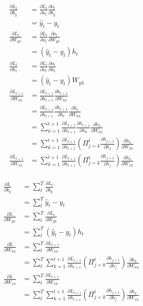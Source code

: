 \documentclass[a4paper]{article}
\begin{document}
\begin{align*}
    \frac{\partial L_t}{\partial b_y}
    &= \frac{\partial L_t}{\partial o_t}\frac{\partial o_t}{\partial b_y} \\
    &= \hat{y}_t-y_t \\
    \frac{\partial L_t}{\partial W_{yh}}
    &= \frac{\partial L_t}{\partial o_t}\frac{\partial o_t}{\partial W_{yh}} \\
    &= (\hat{y}_t-y_t)h_t \\
    \frac{\partial L_t}{\partial h_t}
    &= \frac{\partial L_t}{\partial o_t}\frac{\partial o_t}{\partial h_t} \\
    &= (\hat{y}_t-y_t)W_{yh} \\
    \frac{\partial L_{t+1}}{\partial W_{hh}}
    &= \frac{\partial L_{t+1}}{\partial h_{t+1}}\frac{\partial h_{t+1}}{\partial W_{hh}} \\
    &= \frac{\partial L_{t+1}}{\partial h_{t+1}}\frac{\partial h_{t+1}}{\partial h_t}\frac{\partial h_t}{\partial W_{hh}} \\
    &= \sum_{k=1}^{t+1}\frac{\partial L_{t+1}}{\partial h_{t+1}}\frac{\partial h_{t+1}}{\partial h_k}\frac{\partial h_k}{\partial W_{hh}} \\
    &= \sum_{k=1}^{t+1}\frac{\partial L_{t+1}}{\partial h_{t+1}}\left(\Pi_{j=k}^t\frac{\partial h_{j+1}}{\partial h_j}\right)\frac{\partial h_k}{\partial W_{hh}} \\
    \frac{\partial L_{t+1}}{\partial W_{xh}}
    &= \sum_{k=1}^{t+1}\frac{\partial L_{t+1}}{\partial h_{t+1}}\left(\Pi_{j=k}^t\frac{\partial h_{j+1}}{\partial h_j}\right)\frac{\partial h_k}{\partial W_{xh}} \\
\end{align*}

\begin{align*}
    \frac{\partial L}{\partial b_y}
    &= \sum_t^T\frac{\partial L_t}{\partial b_y} \\
    &= \sum_t^T\hat{y}_t-y_t \\
    \frac{\partial L}{\partial W_{yh}}
    &= \sum_t^T\frac{\partial L_t}{\partial W_{yh}} \\
    &= \sum_t^T(\hat{y}_t-y_t)h_t \\
    \frac{\partial L}{\partial W_{hh}}
    &= \sum_t^T\frac{\partial L_{t+1}}{\partial W_{hh}} \\
    &= \sum_t^T\sum_{k=1}^{t+1}\frac{\partial L_{t+1}}{\partial h_{t+1}}\left(\Pi_{j=k}^t\frac{\partial h_{j+1}}{\partial h_j}\right)\frac{\partial h_k}{\partial W_{hh}} \\
    \frac{\partial L}{\partial W_{xh}}
    &= \sum_t^T\frac{\partial L_{t+1}}{\partial W_{xh}} \\
    &= \sum_t^T\sum_{k=1}^{t+1}\frac{\partial L_{t+1}}{\partial h_{t+1}}\left(\Pi_{j=k}^t\frac{\partial h_{j+1}}{\partial h_j}\right)\frac{\partial h_k}{\partial W_{xh}} \\
\end{align*}
\end{document}
